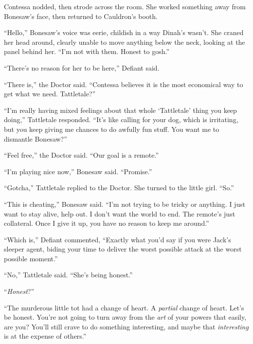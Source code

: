 Contessa nodded, then strode across the room.  She worked something away from Bonesaw's face, then returned to Cauldron's booth.



``Hello,'' Bonesaw's voice was eerie, childish in a way Dinah's wasn't.  She craned her head around, clearly unable to move anything below the neck, looking at the panel behind her.  ``I'm not with them.  Honest to gosh.''



``There's no reason for her to be here,'' Defiant said.



``There is,'' the Doctor said.  ``Contessa believes it is the most economical way to get what we need.  Tattletale?''



``I'm really having mixed feelings about that whole `Tattletale' thing you keep doing,'' Tattletale responded.  ``It's like calling for your dog, which is irritating, but you keep giving me chances to do awfully fun stuff.  You want me to dismantle Bonesaw?''



``Feel free,'' the Doctor said.  ``Our goal is a remote.''



``I'm playing nice now,'' Bonesaw said.  ``Promise.''



``Gotcha,'' Tattletale replied to the Doctor.  She turned to the little girl.  ``So.''



``This is cheating,'' Bonesaw said.  ``I'm not trying to be tricky or anything.  I just want to stay alive, help out.  I don't want the world to end.  The remote's just collateral.  Once I give it up, you have no reason to keep me around.''



``Which is,'' Defiant commented, ``Exactly what you'd say if you were Jack's sleeper agent, biding your time to deliver the worst possible attack at the worst possible moment.''



``No,'' Tattletale said.  ``She's being honest.''



``\emph{Honest}?''



``The murderous little tot had a change of heart.  A \emph{partial} change of heart.  Let's be honest.  You're not going to turn away from the \emph{art} of your powers that easily, are you?  You'll still crave to do something interesting, and maybe that \emph{interesting} is at the expense of others.''



